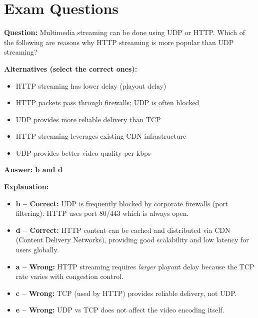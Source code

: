 \section{Exam Questions}

\begin{tcolorbox}[exambox, title=V24 -- Q1.5.4 -- HTTP vs UDP Streaming]
\textbf{Question:} Multimedia streaming can be done using UDP or HTTP. Which of the following are reasons why HTTP streaming is more popular than UDP streaming?

\medskip
\textbf{Alternatives (select the correct ones):}
\begin{itemize}[nosep]
  \item[a)] HTTP streaming has lower delay (playout delay)
  \item[b)] HTTP packets pass through firewalls; UDP is often blocked
  \item[c)] UDP provides more reliable delivery than TCP
  \item[d)] HTTP streaming leverages existing CDN infrastructure
  \item[e)] UDP provides better video quality per kbps
\end{itemize}

\medskip
\textbf{Answer: b and d}

\medskip
\textbf{Explanation:}
\begin{itemize}[nosep]
  \item \textbf{b -- Correct:} UDP is frequently blocked by corporate firewalls (port filtering). HTTP uses port 80/443 which is always open.
  \item \textbf{d -- Correct:} HTTP content can be cached and distributed via CDN (Content Delivery Networks), providing good scalability and low latency for users globally.
  \item \textbf{a -- Wrong:} HTTP streaming requires \emph{larger} playout delay because the TCP rate varies with congestion control.
  \item \textbf{c -- Wrong:} TCP (used by HTTP) provides reliable delivery, not UDP.
  \item \textbf{e -- Wrong:} UDP vs TCP does not affect the video encoding itself.
\end{itemize}
\end{tcolorbox}

